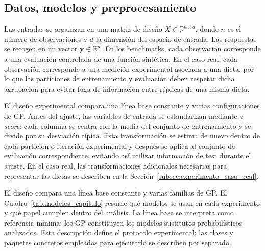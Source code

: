 \subsection{Datos, modelos y preprocesamiento}
\label{subsubsec:representacion_datos}

Las entradas se organizan en una matriz de diseño \(X \in \mathbb{R}^{n \times d}\), donde \(n\) es el número de observaciones y \(d\) la dimensión del espacio de entrada. Las respuestas se recogen en un vector \(\bm{y} \in \mathbb{R}^{n}\). En los benchmarks, cada observación corresponde a una evaluación controlada de una función sintética. En el caso real, cada observación corresponde a una medición experimental asociada a una dieta, por lo que las particiones de entrenamiento y evaluación deben respetar dicha agrupación para evitar fuga de información entre réplicas de una misma dieta.

El diseño experimental compara una línea base constante y varias configuraciones de GP. Antes del ajuste, las variables de entrada se estandarizan mediante \emph{z-score}: cada columna se centra con la media del conjunto de entrenamiento y se divide por su desviación típica. Esta transformación se estima de nuevo dentro de cada partición o iteración experimental y después se aplica al conjunto de evaluación correspondiente, evitando así utilizar información de test durante el ajuste. En el caso real, las transformaciones adicionales necesarias para representar las dietas se describen en la Sección~\ref{subsec:experimento_caso_real}.

El diseño compara una línea base constante y varias familias de GP. El Cuadro~\ref{tab:modelos_capitulo} resume qué modelos se usan en cada experimento y qué papel cumplen dentro del análisis. La línea base se interpreta como referencia mínima; los GP constituyen los modelos sustitutos probabilísticos analizados. Esta descripción define el protocolo experimental; las clases y paquetes concretos empleados para ejecutarlo se describen por separado.

